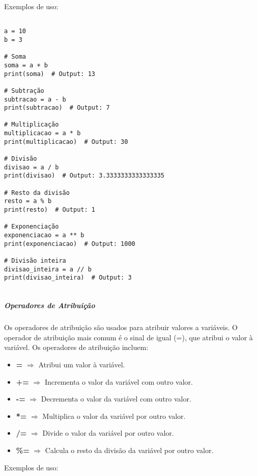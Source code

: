 \documentclass[a4paper, 12pt, onecolumn,singlespacing]{article}
\begin{document}
	Exemplos de uso:
	
\begin{verbatim}

a = 10
b = 3

# Soma
soma = a + b
print(soma)  # Output: 13

# Subtração
subtracao = a - b
print(subtracao)  # Output: 7

# Multiplicação
multiplicacao = a * b
print(multiplicacao)  # Output: 30

# Divisão
divisao = a / b
print(divisao)  # Output: 3.3333333333333335

# Resto da divisão
resto = a % b
print(resto)  # Output: 1

# Exponenciação
exponenciacao = a ** b
print(exponenciacao)  # Output: 1000

# Divisão inteira
divisao_inteira = a // b
print(divisao_inteira)  # Output: 3
		
\end{verbatim}

\label{operadores_aritmeticos}

	\subparagraph{Operadores de Atribuição} 
	\label{python_operadores_atribuicao}
	Os operadores de atribuição são usados para atribuir valores a variáveis. O operador de atribuição mais comum é o sinal de igual (=), que atribui o valor à variável. Os operadores de atribuição incluem:
	
	\begin{itemize}
		\item \textbf{=} $\Rightarrow$ Atribui um valor à variável.
		\item \textbf{+=} $\Rightarrow$ Incrementa o valor da variável com outro valor.
		\item \textbf{-=} $\Rightarrow$ Decrementa o valor da variável com outro valor.
		\item \textbf{*=} $\Rightarrow$ Multiplica o valor da variável por outro valor.
		\item \textbf{/=} $\Rightarrow$ Divide o valor da variável por outro valor.
		\item \textbf{\%=} $\Rightarrow$ Calcula o resto da divisão da variável por outro valor.
	\end{itemize}
	
	Exemplos de uso:
\end{document}
